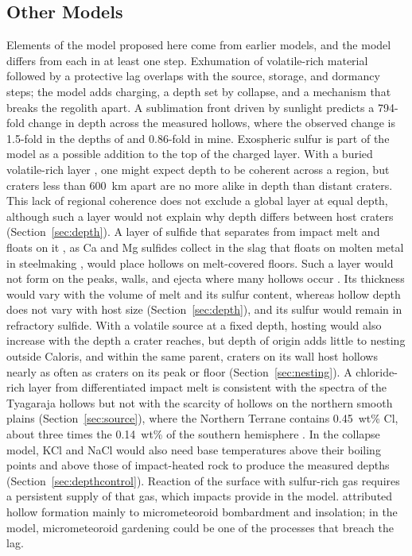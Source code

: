 \documentclass[article,review]{planetary}
\begin{document}
\subsection{Other Models}
\label{sec:others}
Elements of the model proposed here come from earlier models, and the model differs from each in at least one step. Exhumation of volatile-rich material followed by a protective lag \parencite{blewett2013,blewett2016} overlaps with the source, storage, and dormancy steps; the model adds charging, a depth set by collapse, and a mechanism that breaks the regolith apart. A sublimation front driven by sunlight \parencite{phillips2021} predicts a 794-fold change in depth across the measured hollows, where the observed change is 1.5-fold in the depths of \textcite{blewett2016} and 0.86-fold in mine. Exospheric sulfur \parencite{verkercke2025} is part of the model as a possible addition to the top of the charged layer. With a buried volatile-rich layer \parencite{rodriguez2020,rodriguez2023}, one might expect depth to be coherent across a region, but craters less than 600~km apart are no more alike in depth than distant craters. This lack of regional coherence does not exclude a global layer at equal depth, although such a layer would not explain why depth differs between host craters (Section~\ref{sec:depth}). A layer of sulfide that separates from impact melt and floats on it \parencite{vaughan2012}, as Ca and Mg sulfides collect in the slag that floats on molten metal in steelmaking \parencite{helbert2013}, would place hollows on melt-covered floors. Such a layer would not form on the peaks, walls, and ejecta where many hollows occur \parencite{blewett2018}. Its thickness would vary with the volume of melt and its sulfur content, whereas hollow depth does not vary with host size (Section~\ref{sec:depth}), and its sulfur would remain in refractory sulfide. With a volatile source at a fixed depth, hosting would also increase with the depth a crater reaches, but depth of origin adds little to nesting outside Caloris, and within the same parent, craters on its wall host hollows nearly as often as craters on its peak or floor (Section~\ref{sec:nesting}). A chloride-rich layer from differentiated impact melt \parencite{lucchetti2021} is consistent with the spectra of the Tyagaraja hollows but not with the scarcity of hollows on the northern smooth plains (Section~\ref{sec:source}), where the Northern Terrane contains 0.45~wt\% Cl, about three times the 0.14~wt\% of the southern hemisphere \parencite{mccoy2018}. In the collapse model, KCl and NaCl would also need base temperatures above their boiling points and above those of impact-heated rock to produce the measured depths (Section~\ref{sec:depthcontrol}). Reaction of the surface with sulfur-rich gas \parencite{renggli2022} requires a persistent supply of that gas, which impacts provide in the model. \textcite{bickel2025} attributed hollow formation mainly to micrometeoroid bombardment and insolation; in the model, micrometeoroid gardening could be one of the processes that breach the lag.
\end{document}
